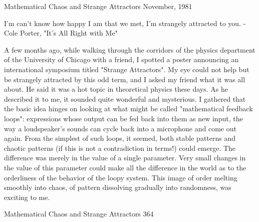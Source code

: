                           Mathematical Chaos
                         and Strange Attractors
                                   November, 1981

                                     I'm can't know how happy I am that we met,
                                     I'm strangely attracted to you.
                                                 -Cole Porter, "It's All Right with Me"


A few months ago, while walking through the corridors of the physics department
of the University of Chicago with a friend, I spotted a poster announcing an
international symposium titled "Strange Attractors". My eye could not help but be
strangely attracted by this odd term, and I asked my friend what it was all about. He
said it was a hot topic in theoretical physics these days. As he described it to me, it
sounded quite wonderful and mysterious.
        I gathered that the basic idea hinges on looking at what might be called
"mathematical feedback loops": expressions whose output can be fed back into them
as new input, the way a loudspeaker's sounds can cycle back into a microphone and
come out again. From the simplest of such loops, it seemed, both stable patterns and
chaotic patterns (if this is not a contradiction in terms!) could emerge. The difference
was merely in the value of a single parameter. Very small changes in the value of this
parameter could make all the difference in the world as to the orderliness of the
behavior of the loopy system. This image of order melting smoothly into chaos, of
pattern dissolving gradually into randomness, was exciting to me.




Mathematical Chaos and Strange Attractors                                           364

